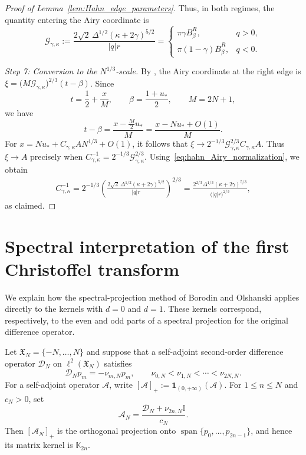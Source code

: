\documentclass[reqno,11pt]{amsart}
\newcommand{\Span}{\operatorname{span}}
\newcommand{\II}{\mathbb{I}}
\theoremstyle{plain}
\theoremstyle{definition}
\numberwithin{equation}{section}
\begin{document}
\begin{proof}[Proof of Lemma~\ref{lem:Hahn_edge_parameters}]
Thus, in both regimes, the quantity entering the Airy coordinate is
\begin{equation}\label{eq:hahn_Airy_normalization}
\mathcal G_{\gamma,\kappa} :=
\frac{
2\sqrt{2}\,
\Delta^{1/2}
(\kappa+2\gamma)^{5/2}
}{
|q|r
} =
\begin{cases}
\pi\gamma B_\beta^R, & q>0,\\
\pi(1-\gamma)\overline B_\beta^R, & q<0.
\end{cases}
\end{equation}

\medskip
\noindent
\emph{Step 7: Conversion to the $N^{1/3}$-scale.}
By \cite[Theorems~3.7 and~3.8]{baik2007discrete}, the Airy
coordinate at the right edge is $\xi =
\bigl(M\mathcal G_{\gamma,\kappa}\bigr)^{2/3}(t-\beta)$. Since
\[
t=\frac12+\frac{x}{M},
\qquad
\beta=\frac{1+u_{\ast}}2,
\qquad
M=2N+1,
\]
we have
\[
t-\beta
=
\frac{x-\frac{M}{2}u_{\ast}}{M}
=
\frac{x-Nu_{\ast}+O(1)}{M}.
\]
For $x = Nu_{\ast} + C_{\gamma,\kappa}A N^{1/3} + O(1)$, it follows that $\xi  \longrightarrow 2^{-1/3} \mathcal G_{\gamma,\kappa}^{2/3} 
C_{\gamma,\kappa}A$. Thus $\xi\to A$ precisely when $C_{\gamma,\kappa}^{-1}
= 2^{-1/3}\mathcal G_{\gamma,\kappa}^{2/3}$.
Using~\eqref{eq:hahn_Airy_normalization}, we obtain
\[
\begin{aligned}
C_{\gamma,\kappa}^{-1} =
2^{-1/3}
\left(
\frac{
2\sqrt{2}\,
\Delta^{1/2}
(\kappa+2\gamma)^{5/2}
}{
|q|r
}
\right)^{2/3} =
\frac{
2^{2/3} \Delta^{1/3}(\kappa+2\gamma)^{5/3}
}{
\bigl(|q|r\bigr)^{2/3}
},
\end{aligned}
\]
as claimed.
\end{proof}


\section{Spectral interpretation of the first Christoffel transform} \label{sec:spectral_first_christoffel}

We explain how the spectral-projection method of Borodin and Olshanski \cite{borodin2007asymptotics,Borodin_2017} applies directly to the kernels with $d=0$ and $d=1$. These kernels correspond, respectively, to the even and odd parts of a spectral projection for the original difference operator. 

Let $\mathfrak X_N=\{-N,\ldots,N\}$ and suppose that a self-adjoint second-order difference operator $\mathcal D_N$ on $\ell^2(\mathfrak X_N)$ satisfies
\[
\mathcal D_Np_m=-\nu_{m,N}p_m,
\qquad
\nu_{0,N}<\nu_{1,N}<\cdots<\nu_{2N,N}.
\]
For a self-adjoint operator $\mathcal A$, write $[\mathcal A]_+:=\mathbf 1_{(0,+\infty)}(\mathcal A)$. For $1\leq n\leq N$ and $c_N>0$, set
\[
\mathcal A_N =
\frac{\mathcal D_N+\nu_{2n,N}\II}{c_N}.
\]
Then $[\mathcal A_N]_+$ is the orthogonal projection onto $\Span\{p_0,\ldots,p_{2n-1}\}$, and hence its matrix kernel is $\mathbb K_{2n}$.
\end{document}
